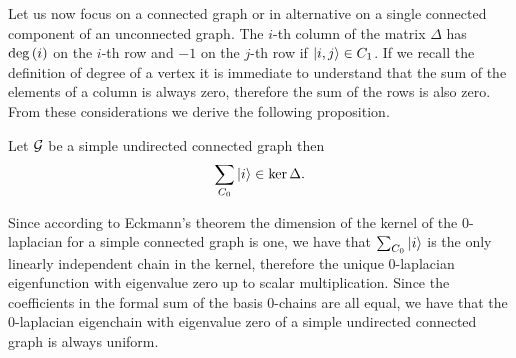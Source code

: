 \documentclass[../2.tex]{subfiles}
\begin{document}
Let us now focus on a connected graph or in alternative on a single connected component of an unconnected graph. 
The $i$-th column of the matrix $\Delta$ has $\operatorname{deg}{(i)}$ on the $i$-th row and $-1$ on the $j$-th row if $| i,j \rangle \in C_1$. If we recall the definition of degree of a vertex
it is immediate to understand that the sum of the elements of a column is always zero, therefore the sum of the rows is also zero. From these considerations
we derive the following proposition.

\begin{prop}
    Let $\mathcal{G}$ be a simple undirected connected graph then 
    \[ \sum_{C_0} | i \rangle \in \ker\Delta. \]
\end{prop}

Since according to Eckmann's theorem the dimension of the kernel of the $0$-laplacian for a simple connected graph is one, 
we have that $\sum_{C_0} | i \rangle$ is the only linearly independent chain in the kernel, therefore the unique $0$-laplacian eigenfunction
with eigenvalue zero up to scalar multiplication. Since the coefficients in the formal sum of the basis $0$-chains are all equal, we have that the $0$-laplacian eigenchain
with eigenvalue zero of a simple undirected connected graph is always uniform.\\
\hfill \\
\end{document}
